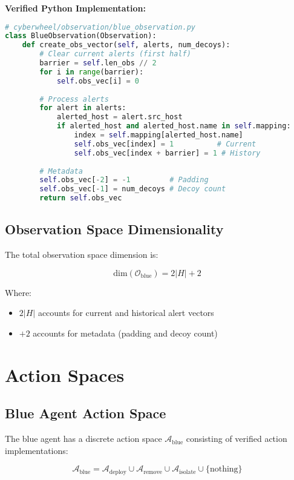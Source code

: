 \documentclass[12pt,a4paper]{article}
\begin{document}
\textbf{Verified Python Implementation:}
\begin{lstlisting}[language=Python, caption=Blue Observation Implementation]
# cyberwheel/observation/blue_observation.py
class BlueObservation(Observation):
    def create_obs_vector(self, alerts, num_decoys):
        # Clear current alerts (first half)
        barrier = self.len_obs // 2
        for i in range(barrier):
            self.obs_vec[i] = 0
        
        # Process alerts
        for alert in alerts:
            alerted_host = alert.src_host
            if alerted_host and alerted_host.name in self.mapping:
                index = self.mapping[alerted_host.name]
                self.obs_vec[index] = 1          # Current
                self.obs_vec[index + barrier] = 1 # History
        
        # Metadata
        self.obs_vec[-2] = -1         # Padding
        self.obs_vec[-1] = num_decoys # Decoy count
        return self.obs_vec
\end{lstlisting}

\subsection{Observation Space Dimensionality}
The total observation space dimension is:

\begin{equation}
\text{dim}(\mathcal{O}_{\text{blue}}) = 2|H| + 2
\end{equation}

Where:
\begin{itemize}
    \item $2|H|$ accounts for current and historical alert vectors
    \item $+2$ accounts for metadata (padding and decoy count)
\end{itemize}

\section{Action Spaces}

\subsection{Blue Agent Action Space}
The blue agent has a discrete action space $\mathcal{A}_{\text{blue}}$ consisting of verified action implementations:

\begin{equation}
\mathcal{A}_{\text{blue}} = \mathcal{A}_{\text{deploy}} \cup \mathcal{A}_{\text{remove}} \cup \mathcal{A}_{\text{isolate}} \cup \{\text{nothing}\}
\end{equation}
\end{document}
